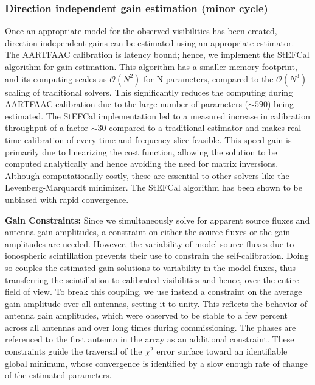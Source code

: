 \documentclass[referee]{aa}
\begin{document}
\subsubsection{\label{sub:Direction-independent-gain}Direction independent gain
estimation (minor cycle)}

Once  an appropriate  model  for  the observed  visibilities  has been  created,
direction-independent gains can be estimated using an appropriate estimator. The
AARTFAAC  calibration  is  latency   bound;  hence,  we  implement  the  StEFCal
\citep{salvini2014stef,salvini2014stefursi} algorithm for gain estimation.  This
algorithm  has  a  smaller  memory   footprint,  and  its  computing  scales  as
$\mathcal{O}(N^{2})$  for  N parameters,  compared  to the  $\mathcal{O}(N^{3})$
scaling of traditional solvers.  This significantly reduces the computing during
AARTFAAC calibration due  to the large number of  parameters ($\sim$$590$) being
estimated.  The StEFCal implementation led to a measured increase in calibration
throughput  of   a  factor   $\sim$30  \citep{salvini2014stef}  compared   to  a
traditional  estimator  and  makes  real-time  calibration  of  every  time  and
frequency slice feasible.   This speed gain is primarily  due to linearizing the
cost  function, allowing  the solution  to  be computed  analytically and  hence
avoiding the need for  matrix inversions. Although computationally costly, these
are  essential to  other solvers  like the  Levenberg-Marquardt  minimizer.  The
StEFCal algorithm has been shown to be unbiased with rapid convergence.

\textbf{Gain  Constraints:} Since  we simultaneously  solve for  apparent source
fluxes and antenna  gain amplitudes, a  constraint on either  the source
fluxes  or the gain  amplitudes are  needed. However,  the variability  of model
source fluxes due  to ionospheric scintillation prevents their  use to constrain
the  self-calibration.   Doing  so  couples  the  estimated  gain  solutions  to
variability  in  the  model  fluxes,  thus  transferring  the  scintillation  to
calibrated visibilities and hence, over the entire field of view.  To break this
coupling, we  use instead a  constraint on the  average gain amplitude  over all
antennas,  setting it to  unity.  This  reflects the  behavior of  antenna gain
amplitudes,  which were  observed  to be  stable  to a  few  percent across  all
antennas and over long times during commissioning.  The phases are referenced to
the first antenna  in the array as an  additional constraint.  These constraints
guide  the traversal  of the  $\chi^{2}$ error  surface toward  an identifiable
global minimum, whose convergence is identified  by a slow enough rate of change
of the estimated parameters.
\end{document}
